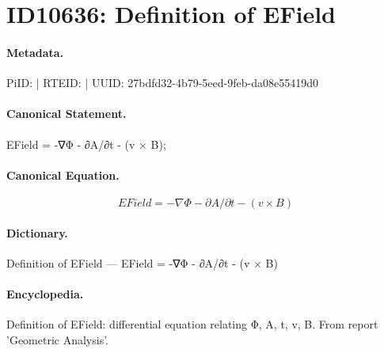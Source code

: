\section*{ID10636: Definition of EField}
\paragraph{Metadata.}
PiID:  | RTEID:  | UUID: 27bdfd32-4b79-5eed-9feb-da08e55419d0

\paragraph{Canonical Statement.}
EField = -∇Φ - ∂A/∂t - (v × B);

\paragraph{Canonical Equation.}
\[
EField = -∇Φ - ∂A/∂t - (v × B)
\]

\paragraph{Dictionary.}
Definition of EField — EField = -∇Φ - ∂A/∂t - (v × B)

\paragraph{Encyclopedia.}
Definition of EField: differential equation relating Φ, A, t, v, B. From report 'Geometric Analysis'.
